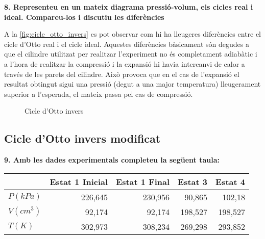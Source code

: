 \documentclass[a4paper]{article}
\begin{document}
\textbf{8. Representeu en un mateix diagrama pressió-volum, els cicles real i ideal. Compareu-los i discutiu les diferències}

A la \autoref{fig:cicle_otto_invers} es pot observar com hi ha lleugeres diferències entre el cicle d'Otto real i el cicle ideal. Aquestes diferències bàsicament són degudes a que el cilindre utilitzat per realitzar l'experiment no és completament adiabàtic i a l'hora de realitzar la compressió i la expansió hi havia intercanvi de calor a través de les parets del cilindre. Això provoca que en el cas de l'expansió el resultat obtingut sigui una pressió (degut a una major temperatura) lleugerament superior a l'esperada, el mateix passa pel cas de compressió.

\begin{figure}[H]
    \centering
    \caption{Cicle d'Otto invers}
    \label{fig:cicle_otto_invers}
\end{figure}

\subsection*{Cicle d'Otto invers modificat}

\textbf{9. Amb les dades experimentals completeu la següent taula:}

\begin{center}
	\begin{tabular}{l|rrrr}
		& Estat 1 Inicial & Estat 1 Final & Estat 3 & Estat 4 \\
		\hline
		$P(kPa)$ & 226,645 & 230,956 & 90,865 & 102,18 \\
		$V(cm^3)$ & 92,174 & 92,174 & 198,527 & 198,527 \\
		$T(K)$ & 302,973 & 308,234 & 269,298 & 293,852 \\
	\end{tabular}
\end{center}
\end{document}
